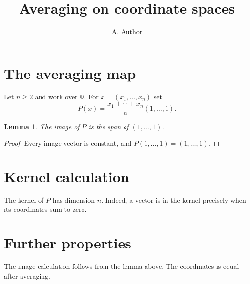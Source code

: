 \documentclass{article}
\title{Averaging on coordinate spaces}
\author{A. Author}
\date{}
\newtheorem{lemma}{Lemma}
\begin{document}
\maketitle
\section{The averaging map}
Let $n\geq 2$ and work over $\mathbb{Q}$. For $x=(x_1,\ldots,x_n)$ set
\[
  P(x)=\frac{x_1+\cdots+x_n}{n}(1,\ldots,1).
\]
\begin{lemma}\label{lem:constant-vectors}
The image of $P$ is the span of $(1,\ldots,1)$.
\end{lemma}
\begin{proof}
Every image vector is constant, and $P(1,\ldots,1)=(1,\ldots,1)$.
\end{proof}
\section{Kernel calculation}
The kernel of $P$ has dimension $n$.
Indeed, a vector is in the kernel precisely when its coordinates sum to zero.
\section{Further properties}
The image calculation follows from the lemma above.
The coordinates is equal after averaging.
\end{document}
